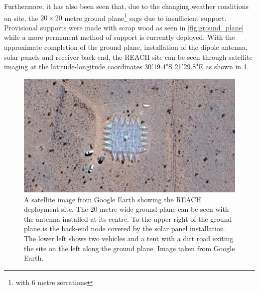 Furthermore, it has also been seen that, due to the changing weather conditions on site, the $20 \times 20$ metre ground plane\footnote{with 6 metre serrations} sags due to insufficient support. Provisional supports were made with scrap wood as seen in \cref{fig:ground_plane} while a more permanent method of support is currently deployed. With the approximate completion of the ground plane, installation of the dipole antenna, solar panels and receiver back-end, the REACH site can be seen through satellite imaging at the latitude-longitude coordinates 30'19.4"S 21'29.8"E as shown in \cref{fig:sat_image}.
\begin{figure}
    \centering
    \includegraphics[width=\textwidth]{sat_image}
    \caption{A satellite image from Google Earth showing the REACH deployment site. The 20 metre wide ground plane can be seen with the antenna installed at its centre. To the upper right of the ground plane is the back-end node covered by the solar panel installation. The lower left shows two vehicles and a tent with a dirt road exiting the site on the left along the ground plane. Image taken from Google Earth.}
    \label{fig:sat_image}
\end{figure}
